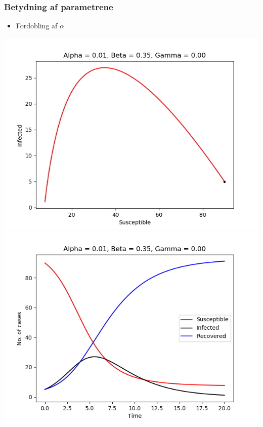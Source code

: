 \begin{frame}
\frametitle{Betydning af parametrene}
\begin{itemize}
\item Fordobling af $\alpha$
\end{itemize}
\includegraphics[scale=0.295]{fig/img/a1_b35_g0.png}
\includegraphics[scale=0.295]{fig/img/t_a1_b35_g0.png}


\end{frame}
